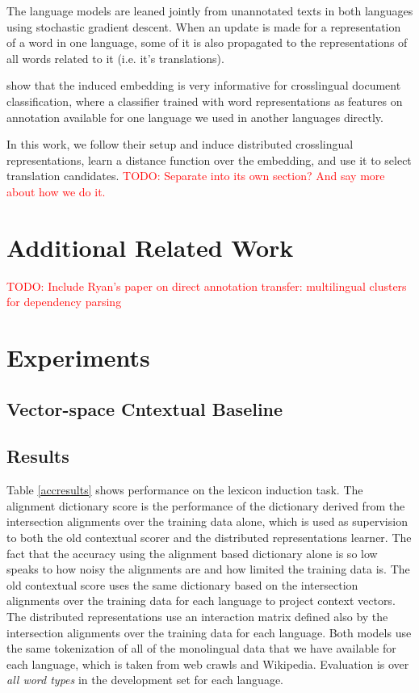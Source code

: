 \documentclass[11pt,letterpaper]{article}
\newcommand{\todo}[1]{\textcolor{red}{TODO: #1}}
\begin{document}
The language models are leaned jointly from unannotated texts in both languages using stochastic gradient descent.  When an update is made for a representation of a word in one language, some of it is also propagated to the representations of all words related to it (i.e. it's translations).

\cite{Klementiev-et-al:COLING2012} show that the induced embedding is very informative for crosslingual document classification, where a classifier trained with word representations as features on annotation available for one language we used in another languages directly.  

In this work, we follow their setup and induce distributed crosslingual representations, learn a distance function over the embedding, and use it to select translation candidates. \todo{Separate into its own section?  And say more about how we do it.}

\section{Additional Related Work} \label{sect:rework}

\todo{Include Ryan's paper on direct annotation transfer: multilingual clusters for dependency parsing}

\section{Experiments} \label{sect:experiemtns}

\subsection{Vector-space Cntextual Baseline}

\subsection{Results}

Table \ref{accresults} shows performance on the lexicon induction task. 
The alignment dictionary score is the performance of the dictionary derived from the intersection alignments over the training data alone, which is used as supervision to both the old contextual scorer and the distributed representations learner.
The fact that the accuracy using the alignment based dictionary alone is so low speaks to how noisy the alignments are and how limited the training data is.
The old contextual score uses the same dictionary based on the intersection alignments over the training data for each language to project context vectors.
The distributed representations use an interaction matrix defined also by the intersection alignments over the training data for each language.
Both models use the same tokenization of all of the monolingual data that we have available for each language, which is taken from web crawls and Wikipedia.
Evaluation is over {\it all word types} in the development set  for each language.
\end{document}
